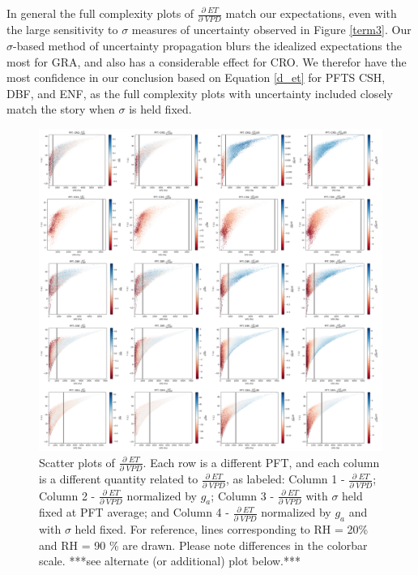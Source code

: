 \documentclass[draft,linenumbers]{agujournal}
\begin{document}
In general the full complexity plots of $\frac{\partial \; ET}{\partial \; VPD}$ match our expectations, even with the large sensitivity to $\sigma$ measures of uncertainty observed in Figure \ref{term3}. Our $\sigma$-based method of uncertainty propagation blurs the idealized expectations the most for GRA, and also has a considerable effect for CRO. We therefor have the most confidence in our conclusion based on Equation \ref{d_et} for PFTS CSH, DBF, and ENF, as the full complexity plots with uncertainty included closely match the story when $\sigma$ is held fixed. %
\begin{figure}[h]
\centering
\includegraphics[width=\textwidth]{./fig06.png}
\caption{Scatter plots of $\frac{\partial \; ET}{\partial \; VPD}$. Each row is a different PFT, and each column is a different quantity related to $\frac{\partial \; ET}{\partial \; VPD}$, as labeled: Column 1 - $\frac{\partial \; ET}{\partial \; VPD}$; Column 2 - $\frac{\partial \; ET}{\partial \; VPD}$ normalized by $g_a$; Column 3 - $\frac{\partial \; ET}{\partial \; VPD}$ with $\sigma$ held fixed at PFT average; and Column 4 - $\frac{\partial \; ET}{\partial \; VPD}$ normalized by $g_a$ and with $\sigma$ held fixed. For reference, lines corresponding to RH = 20\% and RH = 90 \% are drawn. Please note differences in the colorbar scale. ***see alternate (or additional) plot below.***}
\label{real}
\end{figure}
\end{document}
